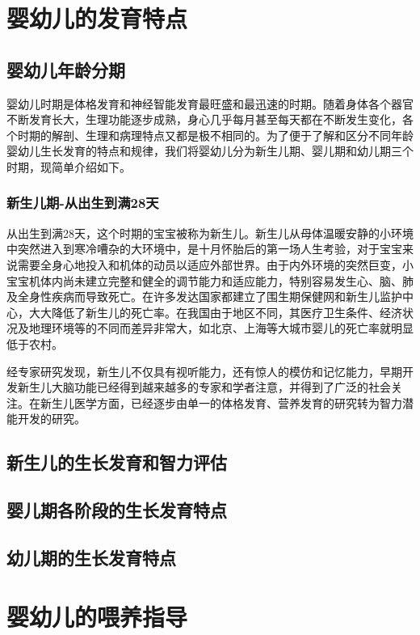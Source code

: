 \documentclass{book}
\begin{document}
\chapter{婴幼儿的发育特点}

\section{婴幼儿年龄分期}

婴幼儿时期是体格发育和神经智能发育最旺盛和最迅速的时期。随着身体各个器官不断发育长大，生理功能逐步成熟，身心几乎每月甚至每天都在不断发生变化，各个时期的解剖、生理和病理特点又都是极不相同的。为了便于了解和区分不同年龄婴幼儿生长发育的特点和规律，我们将婴幼儿分为新生儿期、婴儿期和幼儿期三个时期，现简单介绍如下。


\subsection[新生儿期]{新生儿期-\small 从出生到满28天}

从出生到满28天，这个时期的宝宝被称为新生儿。新生儿从母体温暖安静的小环境中突然进入到寒冷嘈杂的大环境中，是十月怀胎后的第一场人生考验，对于宝宝来说需要全身心地投入和机体的动员以适应外部世界。由于内外环境的突然巨变，小宝宝机体内尚未建立完整和健全的调节能力和适应能力，特别容易发生心、脑、肺及全身性疾病而导致死亡。在许多发达国家都建立了围生期保健网和新生儿监护中心，大大降低了新生儿的死亡率。在我国由于地区不同，其医疗卫生条件、经济状况及地理环境等的不同而差异非常大，如北京、上海等大城市婴儿的死亡率就明显低于农村。

经专家研究发现，新生儿不仅具有视听能力，还有惊人的模仿和记忆能力，早期开发新生儿大脑功能已经得到越来越多的专家和学者注意，并得到了广泛的社会关注。在新生儿医学方面，已经逐步由单一的体格发育、营养发育的研究转为智力潜能开发的研究。


\section{新生儿的生长发育和智力评估}
\section{婴儿期各阶段的生长发育特点}
\section{幼儿期的生长发育特点}

\chapter{婴幼儿的喂养指导}
\end{document}
